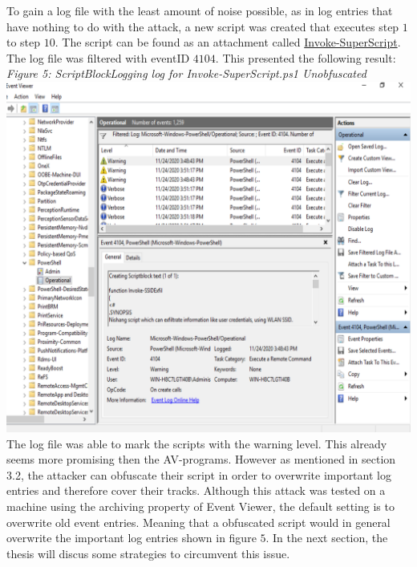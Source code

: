\documentclass{article}%
\begin{document}
To gain a log file with the least amount of noise possible, as in log entries that have nothing to do with the attack, a new script was created that executes step $1$ to step $10$. The script can be found as an attachment called \hyperlink{script3}{Invoke-SuperScript}. The log file was filtered with eventID $4104$. This presented the following result:
\newpage
\textit{Figure 5: ScriptBlockLogging log for Invoke-SuperScript.ps1 Unobfuscated}\\
\includegraphics[scale=0.40]{21.png}
The log file was able to mark the scripts with the warning level. This already seems more promising then the AV-programs. However as mentioned in section 3.2, the attacker can obfuscate their script in order to overwrite important log entries and therefore cover their tracks. Although this attack was tested on a machine using the archiving property of Event Viewer, the default setting is to overwrite old event entries. Meaning that a obfuscated script would in general overwrite the important log entries shown in figure $5$. In the next section, the thesis will discus some strategies to circumvent this issue.
\end{document}
